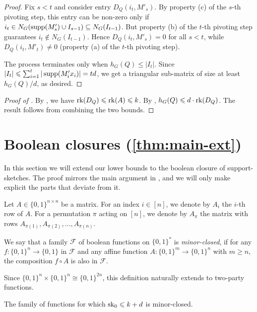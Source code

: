 \documentclass{article}
\begin{document}
\begin{proof}
    Fix $s < t$ and consider entry $D_Q(i_t, M'_s)$. By property (c) of the $s$-th pivoting step, this entry can be non-zero only if $i_t\in N_G(\operatorname{supp}(M'_s)\cup I_{s-1}) \subseteq N_G(I_{t-1})$. But property (b) of the $t$-th pivoting step guarantees $i_t\notin N_G(I_{t-1})$. Hence $D_Q(i_t, M'_s) = 0$ for all $s<t$, while $D_Q(i_t,M'_t)\neq 0$ (property (a) of the $t$-th pivoting step).

    The process terminates only when $h_G(Q) \leq |I_t|$. Since $|I_t|\leqslant \sum_{i = 1}^t|\operatorname{supp}(M'_ix_i)| = td$, we get a triangular sub-matrix of size at least $h_G(Q)/d$, as desired.
\end{proof}
 
\begin{proof}[Proof of ]
    By , we have $\operatorname{rk}(D_Q) \leqslant \operatorname{rk}(A) \leqslant k$.  By , $h_G(Q)\leqslant d\cdot \operatorname{rk}(D_Q)$. The result follows from combining the two bounds.
\end{proof}


\section{Boolean closures (\cref{thm:main-ext})}

In this section we will extend our lower bounds to the boolean closure of support-sketches. The proof mirrors the main argument in \cite{FGHH25}, and we will only make explicit the parts that deviate from it.

\medskip

Let $A \in \{0,1\}^{n\times n}$ be a matrix. For an index $i\in [n]$, we denote by $A_i$ the $i$-th row of $A$. For a permutation $\pi$ acting on $[n]$, we denote by $A_{\pi}$ the matrix with rows $A_{\pi(1)},A_{\pi(2)},\dots, A_{\pi(n)}$.

\begin{boxdefinition}
    We say that a family $\mathcal{F}$ of boolean functions on $\{0,1\}^\ast$ is \emph{minor-closed}, if for any $f\colon\{0,1\}^n\to\{0,1\}$ in $\mathcal{F}$ and any affine function $A\colon\{0,1\}^m\to \{0,1\}^n$ with $m\geq n$, the composition $f\circ A$ is also in $\mathcal{F}$.
\end{boxdefinition}


Since $\{0,1\}^n\times \{0,1\}^n \cong \{0,1\}^{2n}$, this definition naturally extends to two-party functions.

\begin{lemma}\label{lem:SK-closed}
    The family of functions for which $\operatorname{sk}_0 \leqslant k + d$ is minor-closed.
\end{lemma}
\end{document}
